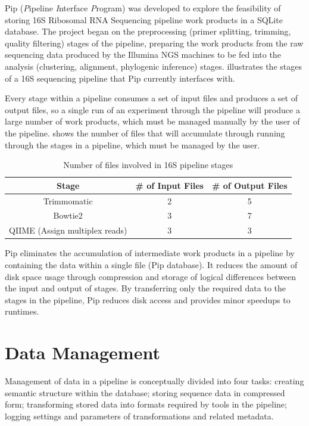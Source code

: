 \documentclass[12pt]{article}
\begin{document}
	Pip (\emph{P}ipeline \emph{I}nterface \emph{P}rogram) was developed to explore the feasibility of 
	storing 16S Ribosomal RNA Sequencing pipeline work products in a SQLite database.
	The project began on the preprocessing (primer splitting, trimming, quality filtering) 
	stages of the pipeline, preparing the work products from the raw sequencing 
	data produced by the Illumina NGS machines to be fed into the analysis (clustering, alignment, phylogenic inference) 
	stages.  illustrates the stages of a 16S sequencing pipeline that Pip currently 
	interfaces with.
	
	Every stage within a pipeline consumes a set of input files and produces a set 
	of output files, so a single run of an experiment through the pipeline will produce
	a large number of work products, which must be managed manually by the user of 
	the pipeline.  shows the number of files that will
	accumulate through running through the stages in a pipeline, which must be managed
	by the user.
	
	\begin{table}[h!]
		\centering
		\begin{tabular}{ccc}
		\toprule
		Stage & {\# of Input Files} & {\# of Output Files}\\
		\midrule
		Trimmomatic & 2 & 5 \\
		Bowtie2 & 3 & 7\\
		QIIME (Assign multiplex reads) & 3 & 3\\
		\bottomrule
		\end{tabular}
		\caption{Number of files involved in 16S pipeline stages}
		\label{tab:stages_files}
	\end{table}
	
	Pip eliminates the accumulation of intermediate work products in a pipeline by
	containing the data within a single file (Pip database). It reduces the amount 
	of disk space usage through compression and storage of logical differences between
	the input and output of stages. By transferring only the required data to the 
	stages in the pipeline, Pip reduces disk access and provides minor speedups to 
	runtimes.
	
	\section{Data Management} %
	\label{sec:data_management}
	Management of data in a pipeline is conceptually divided into four tasks: 
	creating semantic structure within the database; storing sequence data in compressed form;
	transforming stored data into formats required by tools in the pipeline; logging
	settings and parameters of transformations and related metadata.
	
\end{document}
